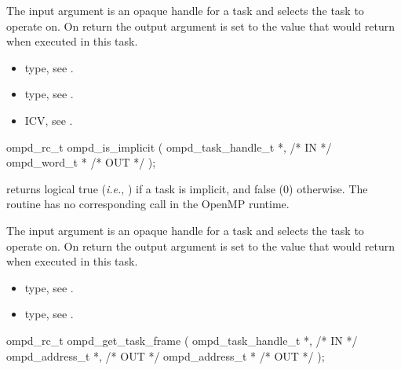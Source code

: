 \argdesc
The input argument  is an opaque handle for a task and selects the task to operate on.
On return the output argument  is set to the value that  would return when
executed in this task.
%

\crossreferences
\begin{itemize}
	\item {} type, see .
	\item {} type, see .
	\item {} ICV, see .
\end{itemize}

\summary

\format
\cspecificstart
\begin{boxedcode}
ompd\_rc\_t ompd\_is\_implicit (
  ompd\_task\_handle\_t  *,                                 /* IN */
  ompd\_word\_t        *                                         /* OUT */
); 
\end{boxedcode}
\cspecificend

\descr
{} returns logical true (\textit{i.e.}, )
if a task is implicit, and false (0) otherwise.
The routine has no corresponding call in the OpenMP runtime.

\argdesc
The input argument  is an opaque handle for a task and selects the task to operate on.
On return the output argument  is set to the value that  would return when
executed in this task.

\crossreferences
\begin{itemize}
	\item {} type, see .
	\item {} type, see .
\end{itemize}



%
\summary

\format
\cspecificstart
\begin{boxedcode}
ompd\_rc\_t ompd\_get\_task\_frame (
  ompd\_task\_handle\_t        *,                           /* IN */
  ompd\_address\_t            *,                    /* OUT */
  ompd\_address\_t            *                  /* OUT */
);
\end{boxedcode}
\cspecificend

